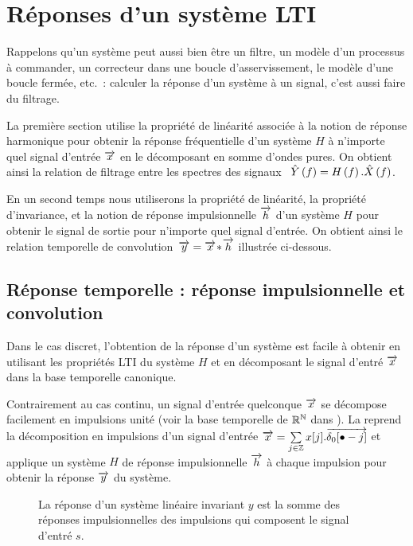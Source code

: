 \section{Réponses d'un système LTI}
Rappelons qu'un système peut aussi bien être un filtre, un modèle d'un processus à commander, un correcteur dans une boucle d'asservissement, le modèle d'une boucle fermée, etc.~: calculer la
réponse d'un système à un signal, c'est aussi \og{}faire du
filtrage.\fg{}

La première section utilise la propriété de linéarité associée à la
notion de réponse harmonique pour obtenir la réponse fréquentielle
d'un système $H$ à n'importe quel signal d'entrée $\overrightarrow{x}$ en le
décomposant en somme d'ondes pures. On obtient ainsi la relation de
filtrage entre les spectres des signaux~
$\hat{Y}\left(f\right)=H\left(f\right).\hat{X}\left(f\right)$.

En un second temps nous utiliserons la propriété de linéarité, la
propriété d'invariance, et la notion de réponse impulsionnelle $\overrightarrow{h}$
d'un système $H$ pour obtenir le signal de sortie pour n'importe quel
signal d'entrée. On obtient ainsi le relation temporelle de
convolution~$\overrightarrow{y} = \overrightarrow{x}\!\ast\!\overrightarrow{h}$ illustrée ci-dessous.


\subsection{Réponse temporelle : réponse impulsionnelle et convolution}
\label{sec:rip}
\def\dj{\vec{\delta_j}}
Dans le cas discret, l'obtention de la réponse d'un système est facile
à obtenir en utilisant les propriétés LTI du système $H$ et en
décomposant le signal d'entré $\overrightarrow{x}$ dans la base temporelle canonique.


Contrairement au cas continu, un signal d'entrée quelconque $\overrightarrow{x}$ se
décompose facilement en impulsions unité (voir la base temporelle de
$\mathbb{R}^{\mathbb{N}}$ dans ). La 
reprend la décomposition en impulsions d'un signal d'entrée
$\overrightarrow{x}=\sum\limits_{j\in\mathbb{Z}}^{}{x[j].\overrightarrow{\delta_0[\bullet-j]}}$ et applique un système
$H$ de réponse impulsionnelle $\overrightarrow{h}$ à chaque impulsion pour obtenir la
réponse $\overrightarrow{y}$ du système.

\begin{figure}[ht!]
  \centering {}
  \caption{La réponse d'un système linéaire invariant $y$ est la somme
    des réponses impulsionnelles des impulsions qui composent le
    signal d'entré $s$.}
  \label{fig:reponse_convolution}
\end{figure}

